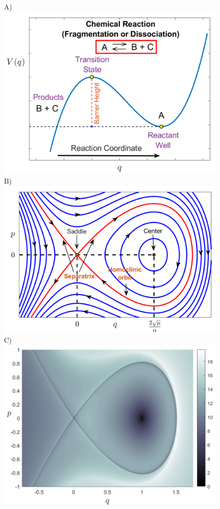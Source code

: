 \documentclass{ws-ijbc}
\begin{document}
\begin{figure}[htbp]
	\begin{center}		
		A)\includegraphics[scale=0.33]{fig4a}
		B)\includegraphics[scale=0.33]{fig4b}
		C)\includegraphics[scale=0.33]{fig4c}

\end{center}
\end{figure}
\end{document}
